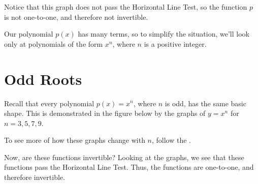 \documentclass{ximera}
\begin{document}
Notice that this graph does not pass the Horizontal Line Test, so the function $p$ is not one-to-one, and therefore not invertible. 

Our polynomial $p(x)$ has many terms, so to simplify the situation, we'll look only at polynomials of the form $x^n$, where $n$ is a positive integer. 

\section{Odd Roots}

Recall that every polynomial $p(x) = x^n$, where $n$ is odd, has the same basic shape. This is demonstrated in the figure below by the graphs of $y = x^n$ for $n = 3, 5,7,9$.

\begin{image}
\end{image}

To see more of how these graphs change with $n$, follow the 
.



Now, are these functions invertible? Looking at the graphs, we see that these functions pass the Horizontal Line Test. Thus, the functions are one-to-one, and therefore invertible.
\end{document}
